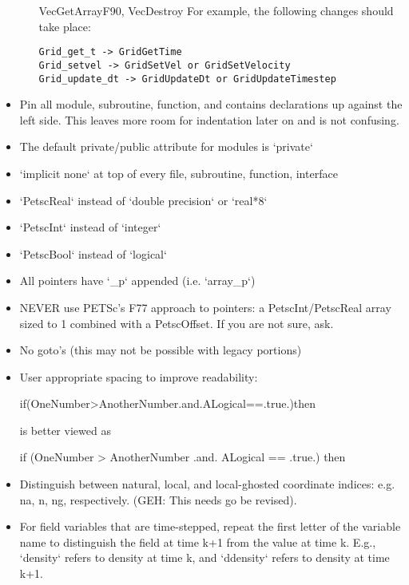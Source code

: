 \begin{itemize}
\begin{itemize}
VecGetArrayF90, VecDestroy
For example, the following changes should take place:

\begin{Verbatim}
Grid_get_t -> GridGetTime
Grid_setvel -> GridSetVel or GridSetVelocity
Grid_update_dt -> GridUpdateDt or GridUpdateTimestep
\end{Verbatim}

\end{itemize}

\item Pin all module, subroutine, function, and contains declarations up against the left side. 
This leaves more room for indentation later on and is not confusing.
\item The default private/public attribute for modules is `private`
\item `implicit none` at top of every file, subroutine, function, interface
\item `PetscReal` instead of `double precision` or `real*8`
\item `PetscInt` instead of `integer`
\item `PetscBool` instead of `logical`
\item All pointers have `\_p` appended (i.e. `array\_p`)
\item NEVER use PETSc's F77 approach to pointers: a PetscInt/PetscReal array sized to 1 combined with a PetscOffset. 
If you are not sure, ask.
\item No goto's (this may not be possible with legacy portions)

\item User appropriate spacing to improve readability:

if(OneNumber>AnotherNumber.and.ALogical==.true.)then

is better viewed as

if (OneNumber > AnotherNumber .and. ALogical == .true.) then

\item Distinguish between natural, local, and local-ghosted coordinate indices: e.g. na, n, ng, respectively. (GEH: This needs go be revised).

\item For field variables that are time-stepped, repeat the first letter of the variable name to 
distinguish the field at time k+1 from the value at time k. E.g., `density` refers to 
density at time k, and `ddensity` refers to density at time k+1.
\end{itemize}

